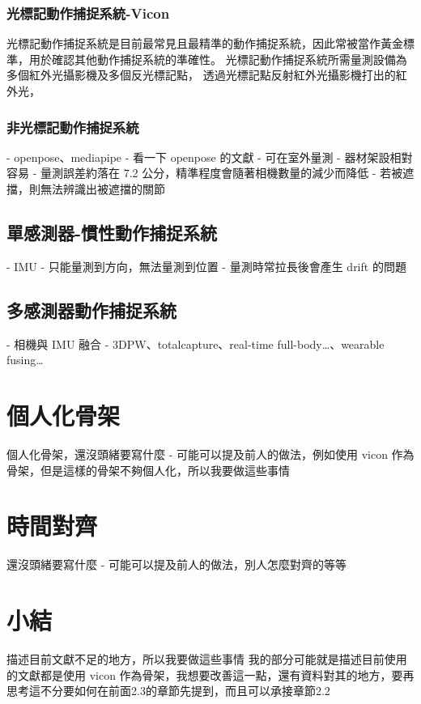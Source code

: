 \subsubsection{光標記動作捕捉系統-Vicon}
光標記動作捕捉系統是目前最常見且最精準的動作捕捉系統，因此常被當作黃金標準，用於確認其他動作捕捉系統的準確性。
光標記動作捕捉系統所需量測設備為多個紅外光攝影機及多個反光標記點，
透過光標記點反射紅外光攝影機打出的紅外光，

\subsubsection{非光標記動作捕捉系統}
- openpose、mediapipe
    - 看一下 openpose 的文獻
    - 可在室外量測
    - 器材架設相對容易
    - 量測誤差約落在 7.2 公分，精準程度會隨著相機數量的減少而降低
    - 若被遮擋，則無法辨識出被遮擋的關節

\subsection{單感測器-慣性動作捕捉系統}
- IMU
    - 只能量測到方向，無法量測到位置
    - 量測時常拉長後會產生 drift 的問題

\subsection{多感測器動作捕捉系統}
- 相機與 IMU 融合
- 3DPW、totalcapture、real-time full-body…、wearable fusing…

\section{個人化骨架}
個人化骨架，還沒頭緒要寫什麼
- 可能可以提及前人的做法，例如使用 vicon 作為骨架，但是這樣的骨架不夠個人化，所以我要做這些事情

\section{時間對齊}
還沒頭緒要寫什麼
- 可能可以提及前人的做法，別人怎麼對齊的等等

\section{小結}
描述目前文獻不足的地方，所以我要做這些事情
我的部分可能就是描述目前使用的文獻都是使用 vicon 作為骨架，我想要改善這一點，還有資料對其的地方，要再思考這不分要如何在前面2.3的章節先提到，而且可以承接章節2.2

